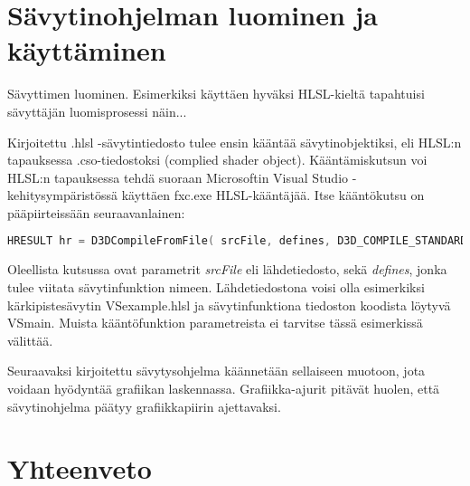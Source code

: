 \documentclass[finnish]{tktltiki2}
\theoremstyle{definition}
\theoremstyle{remark}
\begin{document}
\section{Sävytinohjelman luominen ja käyttäminen}

Sävyttimen luominen. Esimerkiksi käyttäen hyväksi HLSL-kieltä tapahtuisi sävyttäjän luomisprosessi näin...

Kirjoitettu .hlsl -sävytintiedosto tulee ensin kääntää sävytinobjektiksi, eli HLSL:n tapauksessa .cso-tiedostoksi (complied shader object). Kääntämiskutsun voi HLSL:n tapauksessa tehdä suoraan Microsoftin Visual Studio -kehitysympäristössä käyttäen fxc.exe HLSL-kääntäjää. Itse kääntökutsu on pääpiirteissään seuraavanlainen:

\lstset{breaklines=true}
\begin{lstlisting}[language=c++, basicstyle = \small]
HRESULT hr = D3DCompileFromFile( srcFile, defines, D3D_COMPILE_STANDARD_FILE_INCLUDE, entryPoint, profile, flags, 0, &shaderBlob, &errorBlob );
\end{lstlisting}

Oleellista kutsussa ovat parametrit \emph{srcFile} eli lähdetiedosto, sekä \emph{defines}, jonka tulee viitata sävytinfunktion nimeen. Lähdetiedostona voisi olla esimerkiksi kärkipistesävytin VSexample.hlsl ja sävytinfunktiona tiedoston koodista löytyvä VSmain. Muista kääntöfunktion parametreista ei tarvitse tässä esimerkissä välittää.

Seuraavaksi kirjoitettu sävytysohjelma käännetään sellaiseen muotoon, jota voidaan hyödyntää grafiikan laskennassa. Grafiikka-ajurit pitävät huolen, että sävytinohjelma päätyy grafiikkapiirin ajettavaksi.


\section{Yhteenveto}


%
%
% 
%

%






% 
\end{document}
